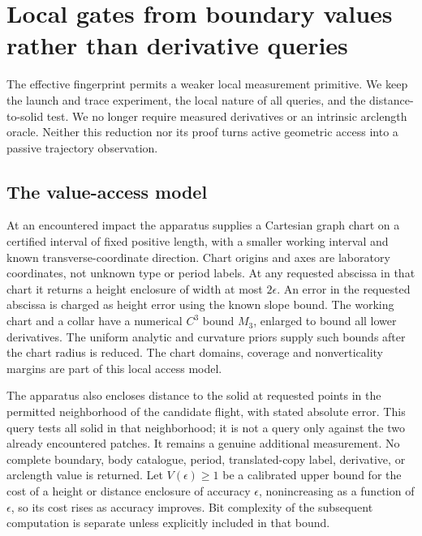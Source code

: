 \section{Local gates from boundary values rather than derivative queries}
\label{sec:value-probe}
The effective fingerprint permits a weaker local measurement primitive.
We keep the launch and trace experiment, the local nature of all queries,
and the distance-to-solid test. We no longer require measured derivatives
or an intrinsic arclength oracle. Neither this reduction nor its proof
turns active geometric access into a passive trajectory observation.

\subsection{The value-access model}
At an encountered impact the apparatus supplies a Cartesian graph chart
on a certified interval of fixed positive length, with a smaller working
interval and known transverse-coordinate direction. Chart origins and
axes are laboratory coordinates, not unknown type or period labels.
At any requested abscissa in that chart it returns a height enclosure of
width at most $2\epsilon$. An error in the requested abscissa is charged
as height error using the known slope bound. The working chart and a
collar have a numerical $C^3$ bound $M_3$, enlarged to bound all lower
derivatives. The uniform analytic and curvature priors supply such
bounds after the chart radius is reduced. The chart domains, coverage
and nonverticality margins are part of this local access model.

The apparatus also encloses distance to the solid at requested points
in the permitted neighborhood of the candidate flight, with stated
absolute error. This query tests all solid in that neighborhood; it is
not a query only against the two already encountered patches. It remains
a genuine additional measurement. No complete boundary, body catalogue,
period, translated-copy label, derivative, or arclength value is returned.
Let $V(\epsilon)\ge1$ be a calibrated upper bound for the cost of a
height or distance enclosure of accuracy $\epsilon$, nonincreasing as a function of $\epsilon$, so its cost rises as
accuracy improves. Bit complexity of the subsequent computation is
separate unless explicitly included in that bound.


